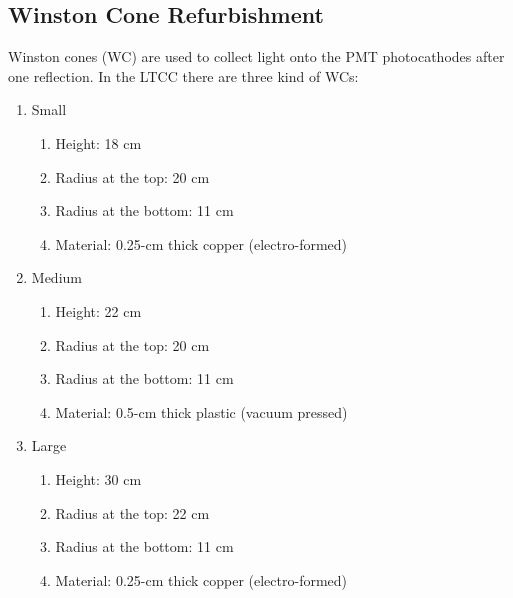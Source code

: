 \subsection{Winston Cone Refurbishment}

Winston cones (WC) are used to collect light onto the PMT photocathodes after one reflection.
In the LTCC there are three kind of WCs:

\begin{enumerate}

\item Small
	\begin{enumerate}
		\item Height: 18 cm
		\item Radius at the top: 20 cm
		\item Radius at the bottom: 11 cm
		\item Material: 0.25-cm thick copper (electro-formed)
	\end{enumerate}

	\item Medium
	\begin{enumerate}
		\item Height: 22 cm
		\item Radius at the top: 20 cm
		\item Radius at the bottom: 11 cm
		\item Material: 0.5-cm thick plastic (vacuum pressed)
	\end{enumerate}

	\item Large
	\begin{enumerate}
		\item Height: 30 cm
		\item Radius at the top: 22 cm
		\item Radius at the bottom: 11 cm
		\item Material: 0.25-cm thick copper (electro-formed)
	\end{enumerate}
\end{enumerate}

